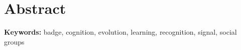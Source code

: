 \section*{Abstract}



\textbf{Keywords:} badge, cognition, evolution, learning, recognition, signal, social groups

\newpage
